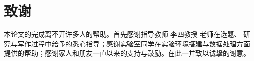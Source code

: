\documentclass[zihao=-4,a4paper]{ctexart}
\newcommand{\AdvisorName}{李四\quad 教授}                  %
\begin{document}
\section*{致\quad 谢}
{}
本论文的完成离不开许多人的帮助。首先感谢指导教师 \AdvisorName{} 老师在选题、
研究与写作过程中给予的悉心指导；感谢实验室同学在实验环境搭建与数据处理方面
提供的帮助；感谢家人和朋友一直以来的支持与鼓励。在此一并致以诚挚的谢意。
\end{document}

